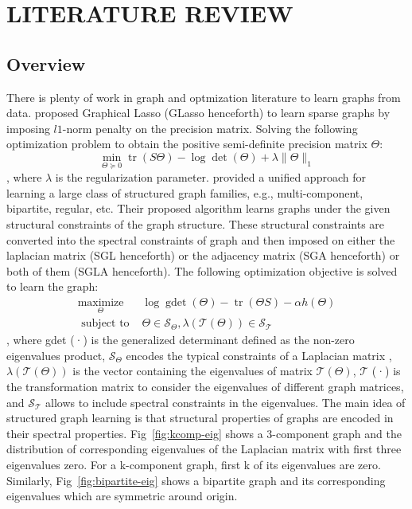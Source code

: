 \chapter{LITERATURE REVIEW}
\label{chap:lit}

\section{Overview}
There is plenty of work in graph and optmization literature to learn graphs from data. \cite{friedman2008sparse} proposed Graphical Lasso (GLasso henceforth) to learn sparse graphs by imposing $l1$-norm penalty on the precision matrix. Solving the following optimization problem to obtain the positive semi-definite precision matrix $\Theta$:
$$\min _{\Theta \succeq 0} \operatorname{tr}(S \Theta)-\log \operatorname{det}(\Theta)+\lambda\|\Theta\|_{1}$$
, where $\lambda$ is the regularization parameter. 
\cite{kumar2019structured, kumar2020unified} provided a unified approach for learning a large class of structured graph families, e.g., multi-component, bipartite, regular, etc. Their proposed algorithm learns graphs under the given structural constraints of the graph structure. These structural constraints are converted into the spectral constraints of graph and then imposed on either the laplacian matrix (SGL henceforth) or the adjacency matrix (SGA henceforth) or both of them (SGLA henceforth). The following optimization objective is solved to learn the graph:
$$\begin{array}{ll}
\underset{\Theta}{\operatorname{maximize}} & \log \operatorname{gdet}(\Theta)-\operatorname{tr}(\Theta S)-\alpha h(\Theta) \\
\text { subject to } & \Theta \in \mathcal{S}_{\Theta}, \lambda(\mathcal{T}(\Theta)) \in \mathcal{S}_{\mathcal{T}}
\end{array}$$
, where gdet (·) is the generalized determinant defined as the non-zero eigenvalues product, $\mathcal{S}_{\Theta}$ encodes the typical constraints of a Laplacian matrix , $\lambda(\mathcal{T}(\Theta))$ is the vector containing the eigenvalues of matrix $\mathcal{T}(\Theta)$, $\mathcal{T}$ (·) is the transformation matrix to consider the eigenvalues of different graph matrices, and $\mathcal{S}_{\mathcal{T}}$ allows to include spectral constraints in the eigenvalues.
The main idea of structured graph learning is that structural properties of graphs are encoded in their spectral properties. Fig~\ref{fig:kcomp-eig} shows a 3-component graph and the distribution of corresponding eigenvalues of the Laplacian matrix with first three eigenvalues zero. For a k-component graph, first k of its eigenvalues are zero. Similarly, Fig~\ref{fig:bipartite-eig} shows a bipartite graph and its corresponding eigenvalues which are symmetric around origin.
